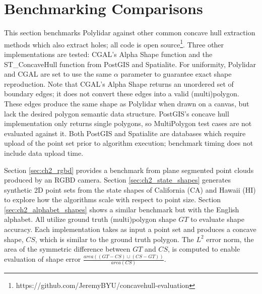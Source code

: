 
\section{Benchmarking Comparisons}\label{sec:ch2_results}

This section benchmarks Polylidar against other common concave hull extraction methods which also extract holes; all code is open source\footnote{https://github.com/JeremyBYU/concavehull-evaluation}. Three other implementations are tested: CGAL's Alpha Shape function and the ST\_ConcaveHull function from PostGIS and Spatialite. For uniformity, Polylidar and CGAL are set to use the same $\alpha$ parameter to guarantee exact shape reproduction. Note that CGAL's Alpha Shape returns an unordered set of boundary edges; it does not convert these edges into a valid (multi)polygon. These edges produce the same shape as Polylidar when drawn on a canvas, but lack the desired polygon semantic data structure. PostGIS's concave hull implementation only returns single polygons, so MultiPolygon test cases are not evaluated against it. Both PostGIS and Spatialite are databases which require upload of the point set prior to algorithm execution; benchmark timing does not include data upload time. 

Section \ref{sec:ch2_rgbd} provides a benchmark from plane segmented point clouds produced by an RGBD camera. Section \ref{sec:ch2_state_shapes} generates synthetic 2D point sets from the state shapes of California (CA) and Hawaii (HI) to explore how the algorithms scale with respect to point size.  Section \ref{sec:ch2_alphabet_shapes} shows a similar benchmark but with the English alphabet. All utilize ground truth (multi)polygon shape $GT$ to evaluate shape accuracy. 
Each implementation takes as input a point set and produces a concave shape, $CS$, which is similar to the ground truth polygon.  The $L^2$ error norm, the area of the symmetric difference between $GT$ and $CS$, is computed to enable evaluation of shape error $\frac{area((GT-CS) \cup (CS-GT))}{area(CS)}$. 

